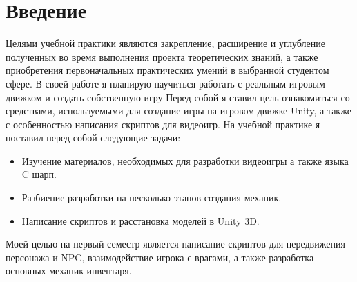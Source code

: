 
\part {Введение}

Целями учебной практики являются закрепление, расширение и
углубление полученных во время выполнения проекта теоретических знаний, а
также приобретения первоначальных практических умений в выбранной
студентом сфере. В своей работе я планирую научиться работать с реальным
игровым движком и создать собственную игру
\newline
Перед собой я ставил цель ознакомиться со средствами, используемыми
для создание игры на игровом движке Unity, а также с особенностью написания
скриптов для видеоигр.
\newline
На учебной практике я поставил перед собой следующие задачи:
\newline
\begin{itemize}
\item  Изучение материалов, необходимых для разработки видеоигры а
также языка C шарп.
\item  Разбиение разработки на несколько этапов создания механик.
\item  Написание скриптов и расстановка моделей в Unity 3D.
\end{itemize}
Моей целью на первый семестр является написание скриптов для передвижения
персонажа и NPC, взаимодействие игрока с врагами, а также разработка
основных механик инвентаря.